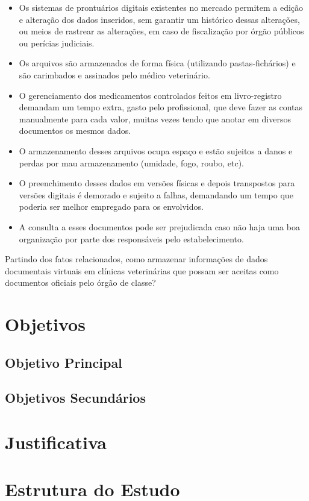     \begin{itemize}
        \item 
        Os sistemas de prontuários digitais existentes no mercado permitem a edição e alteração dos dados inseridos, sem garantir um histórico dessas alterações, ou meios de rastrear as alterações, em caso de fiscalização por órgão públicos ou perícias judiciais.
        
        \item
        Os arquivos são armazenados de forma física (utilizando pastas-fichários) e são carimbados e assinados pelo médico veterinário.
        
        \item
        O gerenciamento dos medicamentos controlados feitos em livro-registro demandam um tempo extra, gasto pelo profissional, que deve fazer as contas manualmente para cada valor, muitas vezes tendo que anotar em diversos documentos os mesmos dados.
        
        \item
        O armazenamento desses arquivos ocupa espaço e estão sujeitos a danos e perdas por mau armazenamento (umidade, fogo, roubo, etc).
        
        \item
        O preenchimento desses dados em versões físicas e depois transpostos para versões digitais é demorado e sujeito a falhas, demandando um tempo que poderia ser melhor empregado para os envolvidos.
        
        \item
        A consulta a esses documentos pode ser prejudicada caso não haja uma boa organização por parte dos responsáveis pelo estabelecimento.
    \end{itemize}


    Partindo dos fatos relacionados, como armazenar informações de dados documentais virtuais em clínicas veterinárias que possam ser aceitas como documentos oficiais pelo órgão de classe?

\section{Objetivos}
    \preencheComTexto
    
    \subsection{Objetivo Principal}
    \preencheComTexto
    
    \subsection{Objetivos Secundários}
    \preencheComTexto
    
    \section{Justificativa}
    \preencheComTexto
    
    \section{Estrutura do Estudo}
    \preencheComTexto

